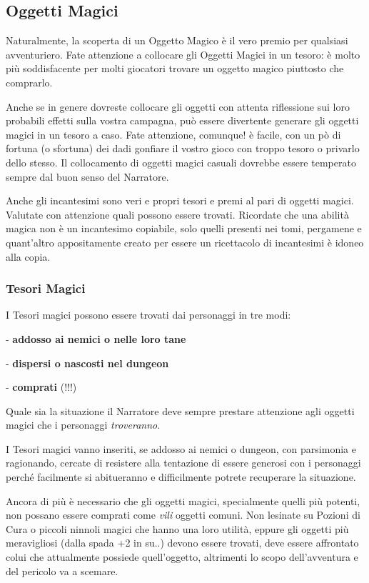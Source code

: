 \begin{multicols}{2}
\subsection{Oggetti Magici}

Naturalmente, la scoperta di un Oggetto Magico è il vero premio per qualsiasi avventuriero. Fate attenzione a collocare gli Oggetti Magici in un tesoro: è molto più soddisfacente per molti giocatori trovare un oggetto magico piuttosto che comprarlo.

Anche se in genere dovreste collocare gli oggetti con attenta riflessione sui loro probabili effetti sulla vostra campagna, può essere divertente generare gli oggetti magici in un tesoro a caso. Fate attenzione, comunque! è facile, con un pò di fortuna (o sfortuna) dei dadi gonfiare il vostro gioco con troppo tesoro o privarlo dello stesso. Il collocamento di oggetti magici casuali dovrebbe essere temperato sempre dal buon senso del Narratore.

Anche gli incantesimi sono veri e propri tesori e premi al pari di oggetti magici. Valutate con attenzione quali possono essere trovati. Ricordate che una abilità magica non è un incantesimo copiabile, solo quelli presenti nei tomi, pergamene e quant'altro appositamente creato per essere un ricettacolo di incantesimi è idoneo alla copia.


\subsubsection{Tesori Magici}\label{tesorimagici}

I Tesori magici possono essere trovati dai personaggi in tre modi:

\medskip

- \textbf{addosso ai nemici o nelle loro tane}

- \textbf{dispersi o nascosti nel dungeon}

- \textbf{comprati} (!!!)

\medskip


Quale sia la situazione il Narratore deve sempre prestare attenzione agli oggetti magici che i personaggi \emph{troveranno}.

I Tesori magici vanno inseriti, se addosso ai nemici o dungeon, con parsimonia e ragionando, cercate di resistere alla tentazione di essere generosi con i personaggi perché facilmente si abitueranno e difficilmente potrete recuperare la situazione.

Ancora di più è necessario che gli oggetti magici, specialmente quelli più potenti, non possano essere comprati come \emph{vili} oggetti comuni. Non lesinate su Pozioni di Cura o piccoli ninnoli magici che hanno una loro utilità, eppure gli oggetti più meravigliosi (dalla spada +2 in su..) devono essere trovati, deve essere affrontato colui che attualmente possiede quell'oggetto, altrimenti lo scopo dell'avventura e del pericolo va a scemare.


\end{multicols}
